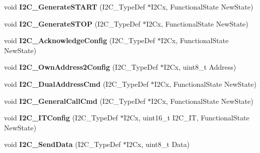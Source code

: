 \begin{DoxyCompactItemize}
\item 
\hypertarget{group__I2C__Exported__Functions_ga36c522b471588be9779c878222ccb20f}{
void {\bfseries I2C\_\-GenerateSTART} (I2C\_\-TypeDef $\ast$I2Cx, FunctionalState NewState)}
\label{group__I2C__Exported__Functions_ga36c522b471588be9779c878222ccb20f}

\item 
\hypertarget{group__I2C__Exported__Functions_ga5c92cb573ca0ae58cc465e5400246561}{
void {\bfseries I2C\_\-GenerateSTOP} (I2C\_\-TypeDef $\ast$I2Cx, FunctionalState NewState)}
\label{group__I2C__Exported__Functions_ga5c92cb573ca0ae58cc465e5400246561}

\item 
\hypertarget{group__I2C__Exported__Functions_ga7bb44e894d68a7991f564c43fb187486}{
void {\bfseries I2C\_\-AcknowledgeConfig} (I2C\_\-TypeDef $\ast$I2Cx, FunctionalState NewState)}
\label{group__I2C__Exported__Functions_ga7bb44e894d68a7991f564c43fb187486}

\item 
\hypertarget{group__I2C__Exported__Functions_ga7be2cc634a613c8e3539137e897a22df}{
void {\bfseries I2C\_\-OwnAddress2Config} (I2C\_\-TypeDef $\ast$I2Cx, uint8\_\-t Address)}
\label{group__I2C__Exported__Functions_ga7be2cc634a613c8e3539137e897a22df}

\item 
\hypertarget{group__I2C__Exported__Functions_ga02145a333a56e79557d6ef4ea03fc313}{
void {\bfseries I2C\_\-DualAddressCmd} (I2C\_\-TypeDef $\ast$I2Cx, FunctionalState NewState)}
\label{group__I2C__Exported__Functions_ga02145a333a56e79557d6ef4ea03fc313}

\item 
\hypertarget{group__I2C__Exported__Functions_ga65c740fc8d7b3b9f15cc432d8699d471}{
void {\bfseries I2C\_\-GeneralCallCmd} (I2C\_\-TypeDef $\ast$I2Cx, FunctionalState NewState)}
\label{group__I2C__Exported__Functions_ga65c740fc8d7b3b9f15cc432d8699d471}

\item 
\hypertarget{group__I2C__Exported__Functions_ga58fed146a06cb81d2940604e460de047}{
void {\bfseries I2C\_\-ITConfig} (I2C\_\-TypeDef $\ast$I2Cx, uint16\_\-t I2C\_\-IT, FunctionalState NewState)}
\label{group__I2C__Exported__Functions_ga58fed146a06cb81d2940604e460de047}

\item 
\hypertarget{group__I2C__Exported__Functions_ga7bd9e70b8eafde0dd5eb42b0d95fe1a9}{
void {\bfseries I2C\_\-SendData} (I2C\_\-TypeDef $\ast$I2Cx, uint8\_\-t Data)}
\label{group__I2C__Exported__Functions_ga7bd9e70b8eafde0dd5eb42b0d95fe1a9}


\end{DoxyCompactItemize}
